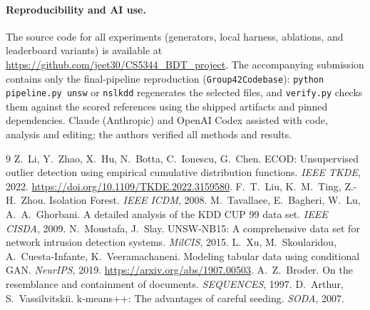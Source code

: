 \documentclass[10pt,a4paper]{article}
\begin{document}
\paragraph{Reproducibility and AI use.}
The source code for all experiments (generators, local harness, ablations, and leaderboard variants) is available at \url{https://github.com/jeet30/CS5344_BDT_project}. The accompanying submission contains only the final-pipeline reproduction (\texttt{Group42Codebase}): \texttt{python pipeline.py unsw} or \texttt{nslkdd} regenerates the selected files, and \texttt{verify.py} checks them against the scored references using the shipped artifacts and pinned dependencies. Claude (Anthropic) and OpenAI Codex assisted with code, analysis and editing; the authors verified all methods and results.

\clearpage
\begin{thebibliography}{9}\small
{} Z.~Li, Y.~Zhao, X.~Hu, N.~Botta, C.~Ionescu, G.~Chen. ECOD: Unsupervised outlier detection using empirical cumulative distribution functions. \emph{IEEE TKDE}, 2022. \url{https://doi.org/10.1109/TKDE.2022.3159580}.
 F.~T.~Liu, K.~M.~Ting, Z.-H.~Zhou. Isolation Forest. \emph{IEEE ICDM}, 2008.
 M.~Tavallaee, E.~Bagheri, W.~Lu, A.~A.~Ghorbani. A detailed analysis of the KDD CUP 99 data set. \emph{IEEE CISDA}, 2009.
 N.~Moustafa, J.~Slay. UNSW-NB15: A comprehensive data set for network intrusion detection systems. \emph{MilCIS}, 2015.
 L.~Xu, M.~Skoularidou, A.~Cuesta-Infante, K.~Veeramachaneni. Modeling tabular data using conditional GAN. \emph{NeurIPS}, 2019. \url{https://arxiv.org/abs/1907.00503}.
 A.~Z.~Broder. On the resemblance and containment of documents. \emph{SEQUENCES}, 1997.
 D.~Arthur, S.~Vassilvitskii. k-means++: The advantages of careful seeding. \emph{SODA}, 2007.
\end{thebibliography}
\end{document}
